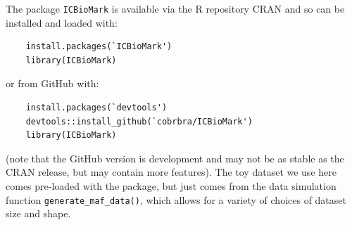 \documentclass[../thesis.tex]{subfiles}
\begin{document}
The package \texttt{ICBioMark} is available via the R repository CRAN and so can be installed and loaded with:
\begin{lstlisting}
    install.packages(`ICBioMark')
    library(ICBioMark)
\end{lstlisting}
or from GitHub with:
\begin{lstlisting}
    install.packages(`devtools') 
    devtools::install_github(`cobrbra/ICBioMark')
    library(ICBioMark)
\end{lstlisting}
(note that the GitHub version is development and may not be as stable as the CRAN release, but may contain more features). The toy dataset we use here comes pre-loaded with the package, but just comes from the data simulation function \lstinline{generate_maf_data()}, which allows for a variety of choices of dataset size and shape.
\end{document}
